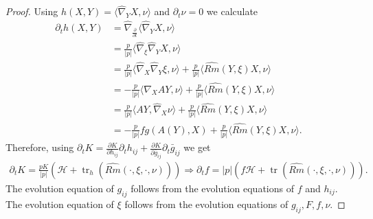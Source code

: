 \documentclass{amsart}
\theoremstyle{definition}
\theoremstyle{remark}
\numberwithin{equation}{section}
\begin{document}
\begin{proof}
Using $h(X,Y)=\langle \hat{\nabla}_{Y}X, \nu\rangle$ and $\partial_t\nu=0$ we calculate
\begin{align*}
\partial_t h(X,Y)&=\hat{\nabla}_{\frac{\partial}{\partial t}}\langle \hat{\nabla}_{Y}X,\nu\rangle\\
&=\frac{p}{|p|}\langle \hat{\nabla}_{\xi}\hat{\nabla}_{Y}X,\nu\rangle\\
&=\frac{p}{|p|}\langle \hat{\nabla}_{X}\hat{\nabla}_{Y}\xi,\nu\rangle+ \frac{p}{|p|}\langle \widehat{Rm}(Y,\xi)X,\nu\rangle\\
&=-\frac{p}{|p|}\langle \hat{\nabla}_{X}AY,\nu\rangle+ \frac{p}{|p|}\langle \widehat{Rm}(Y,\xi)X,\nu\rangle\\
&=\frac{p}{|p|}\langle AY,\hat{\nabla}_{X}\nu\rangle+ \frac{p}{|p|}\langle \widehat{Rm}(Y,\xi)X,\nu\rangle\\
&=-\frac{p}{|p|} f  g(A(Y),X)+\frac{p}{|p|}\langle \widehat{Rm}(Y,\xi)X,\nu\rangle.
\end{align*}
Therefore, using $\partial_t K=\frac{\partial K}{\partial h_{ij}}\partial_th_{ij}+\frac{\partial K}{\partial \bar{g}_{ij}}\partial_t\bar{g}_{ij}$ we get
\begin{align*}
\partial_tK=\frac{pK}{|p|}(\mathcal{H}+\operatorname{tr}_h (\widehat{Rm}(\cdot,\xi,\cdot,\nu)))\Rightarrow \partial_tf=|p|(f\mathcal{H}+\operatorname{tr} (\widehat{Rm}(\cdot,\xi,\cdot,\nu))).
\end{align*}
The evolution equation of $g_{ij}$ follows from the evolution equations of $ f $ and $h_{ij}.$ The evolution equation of $\xi$ follows from the evolution equations of $g_{ij}, F,  f ,\nu.$ %

\end{proof}
\end{document}

